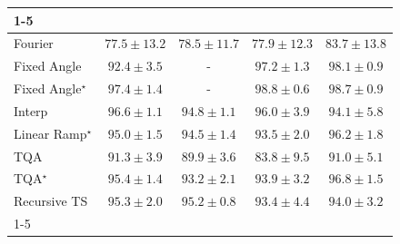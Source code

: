 \begin{tabular}{l|cccc|}
\cline{1-5}
\multicolumn{5}{c}{\rule{0pt}{8pt}SV} \\
\midrule
Fourier & {\cellcolor[HTML]{FEF6FB}} \color[HTML]{000000} $77.5\pm 13.2$ & {\cellcolor[HTML]{F7F0F7}} \color[HTML]{000000} $78.5\pm 11.7$ & {\cellcolor[HTML]{FCF4FA}} \color[HTML]{000000} $77.9\pm 12.3$ & {\cellcolor[HTML]{C2CBE2}} \color[HTML]{000000} $83.7\pm 13.8$ \\
Fixed Angle & {\cellcolor[HTML]{1B7EB7}} \color[HTML]{F1F1F1} $92.4\pm 3.5$ & {\cellcolor[HTML]{000000}} \color[HTML]{F1F1F1} {\cellcolor{white}} \color{black} - & {\cellcolor[HTML]{034E7B}} \color[HTML]{F1F1F1} $97.2\pm 1.3$ & {\cellcolor[HTML]{034369}} \color[HTML]{F1F1F1} $98.1\pm 0.9$ \\
Fixed Angle$^\star$ & {\cellcolor[HTML]{034B76}} \color[HTML]{F1F1F1} $97.4\pm 1.4$ & {\cellcolor[HTML]{000000}} \color[HTML]{F1F1F1} {\cellcolor{white}} \color{black} - & {\cellcolor[HTML]{023A5B}} \color[HTML]{F1F1F1} $98.8\pm 0.6$ & {\cellcolor[HTML]{023B5D}} \color[HTML]{F1F1F1} $98.7\pm 0.9$ \\
Interp & {\cellcolor[HTML]{045687}} \color[HTML]{F1F1F1} $96.6\pm 1.1$ & {\cellcolor[HTML]{0566A0}} \color[HTML]{F1F1F1} $94.8\pm 1.1$ & {\cellcolor[HTML]{045C90}} \color[HTML]{F1F1F1} $96.0\pm 3.9$ & {\cellcolor[HTML]{056CAA}} \color[HTML]{F1F1F1} $94.1\pm 5.8$ \\
Linear Ramp$^\star$ & {\cellcolor[HTML]{04649E}} \color[HTML]{F1F1F1} $95.0\pm 1.5$ & {\cellcolor[HTML]{0569A4}} \color[HTML]{F1F1F1} $94.5\pm 1.4$ & {\cellcolor[HTML]{0771B1}} \color[HTML]{F1F1F1} $93.5\pm 2.0$ & {\cellcolor[HTML]{045B8E}} \color[HTML]{F1F1F1} $96.2\pm 1.8$ \\
TQA & {\cellcolor[HTML]{2F8BBE}} \color[HTML]{F1F1F1} $91.3\pm 3.9$ & {\cellcolor[HTML]{4C99C5}} \color[HTML]{F1F1F1} $89.9\pm 3.6$ & {\cellcolor[HTML]{C1CAE2}} \color[HTML]{000000} $83.8\pm 9.5$ & {\cellcolor[HTML]{348EBF}} \color[HTML]{F1F1F1} $91.0\pm 5.1$ \\
TQA$^\star$ & {\cellcolor[HTML]{046198}} \color[HTML]{F1F1F1} $95.4\pm 1.4$ & {\cellcolor[HTML]{0C74B2}} \color[HTML]{F1F1F1} $93.2\pm 2.1$ & {\cellcolor[HTML]{056DAC}} \color[HTML]{F1F1F1} $93.9\pm 3.2$ & {\cellcolor[HTML]{045483}} \color[HTML]{F1F1F1} $96.8\pm 1.5$ \\
Recursive TS & {\cellcolor[HTML]{046299}} \color[HTML]{F1F1F1} $95.3\pm 2.0$ & {\cellcolor[HTML]{04639B}} \color[HTML]{F1F1F1} $95.2\pm 0.8$ & {\cellcolor[HTML]{0872B1}} \color[HTML]{F1F1F1} $93.4\pm 4.4$ & {\cellcolor[HTML]{056DAB}} \color[HTML]{F1F1F1} $94.0\pm 3.2$ \\
\cline{1-5}
\bottomrule
\end{tabular}
